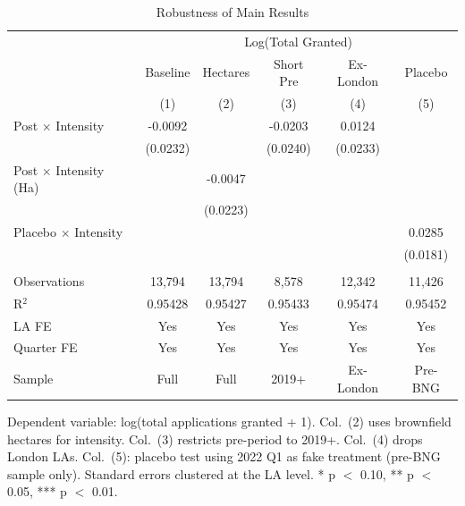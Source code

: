 
\begin{table}[htbp]
   \caption{\label{tab:robustness} Robustness of Main Results}
   \bigskip
   \centering
   \begin{tabular}{lccccc}
      \toprule
       & \multicolumn{5}{c}{Log(Total Granted)}\\
                                    & Baseline & Hectares & Short Pre & Ex-London & Placebo \\   
                                    & (1)      & (2)      & (3)       & (4)       & (5)\\  
      \midrule 
      Post $\times$ Intensity       & -0.0092  &          & -0.0203   & 0.0124    &   \\   
                                    & (0.0232) &          & (0.0240)  & (0.0233)  &   \\   
      Post $\times$ Intensity (Ha)  &          & -0.0047  &           &           &   \\   
                                    &          & (0.0223) &           &           &   \\   
      Placebo $\times$ Intensity    &          &          &           &           & 0.0285\\   
                                    &          &          &           &           & (0.0181)\\   
       \\
      Observations                  & 13,794   & 13,794   & 8,578     & 12,342    & 11,426\\  
      R$^2$                         & 0.95428  & 0.95427  & 0.95433   & 0.95474   & 0.95452\\  
      LA FE                         & Yes      & Yes      & Yes       & Yes       & Yes\\  
      Quarter FE                    & Yes      & Yes      & Yes       & Yes       & Yes\\  
      Sample                        & Full     & Full     & 2019+     & Ex-London & Pre-BNG\\  
      \bottomrule
   \end{tabular}
   
   \par \raggedright 
   Dependent variable: log(total applications granted + 1). Col.\ (2) uses brownfield hectares for intensity. Col.\ (3) restricts pre-period to 2019+. Col.\ (4) drops London LAs. Col.\ (5): placebo test using 2022 Q1 as fake treatment (pre-BNG sample only). Standard errors clustered at the LA level. * p $<$ 0.10, ** p $<$ 0.05, *** p $<$ 0.01.
\end{table}


